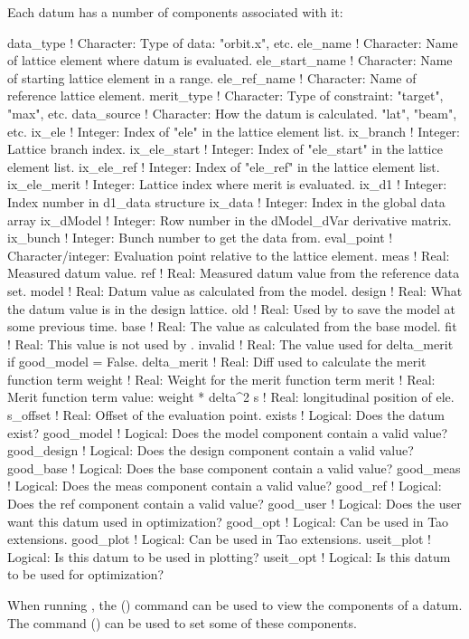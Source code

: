 Each datum has a number of components associated with it:
\begin{example}
  data_type        ! Character: Type of data: "orbit.x", etc.
  ele_name         ! Character: Name of lattice element where datum is evaluated.
  ele_start_name   ! Character: Name of starting lattice element in a range.
  ele_ref_name     ! Character: Name of reference lattice element.
  merit_type       ! Character: Type of constraint: "target", "max", etc.
  data_source      ! Character: How the datum is calculated. "lat", "beam", etc.
  ix_ele           ! Integer: Index of "ele" in the lattice element list.
  ix_branch        ! Integer: Lattice branch index.
  ix_ele_start     ! Integer: Index of "ele_start" in the lattice element list.
  ix_ele_ref       ! Integer: Index of "ele_ref" in the lattice element list.
  ix_ele_merit     ! Integer: Lattice index where merit is evaluated.
  ix_d1            ! Integer: Index number in d1_data structure
  ix_data          ! Integer: Index in the global data array
  ix_dModel        ! Integer: Row number in the dModel_dVar derivative matrix.
  ix_bunch         ! Integer: Bunch number to get the data from.
  eval_point       ! Character/integer: Evaluation point relative to the lattice element.
  meas             ! Real: Measured datum value. 
  ref              ! Real: Measured datum value from the reference data set.
  model            ! Real: Datum value as calculated from the model.
  design           ! Real: What the datum value is in the design lattice.
  old              ! Real: Used by \tao to save the model at some previous time.
  base             ! Real: The value as calculated from the base model.
  fit              ! Real: This value is not used by \tao.
  invalid          ! Real: The value used for delta_merit if good_model = False.
  delta_merit      ! Real: Diff used to calculate the merit function term 
  weight           ! Real: Weight for the merit function term
  merit            ! Real: Merit function term value: weight * delta^2
  s                ! Real: longitudinal position of ele.
  s_offset         ! Real: Offset of the evaluation point.
  exists           ! Logical: Does the datum exist?
  good_model       ! Logical: Does the model  component contain a valid value?
  good_design      ! Logical: Does the design component contain a valid value?
  good_base        ! Logical: Does the base   component contain a valid value?
  good_meas        ! Logical: Does the meas   component contain a valid value?
  good_ref         ! Logical: Does the ref    component contain a valid value?
  good_user        ! Logical: Does the user want this datum used in optimization?
  good_opt         ! Logical: Can be used in Tao extensions.
  good_plot        ! Logical: Can be used in Tao extensions.
  useit_plot       ! Logical: Is this datum to be used in plotting?
  useit_opt        ! Logical: Is this datum to be used for optimization?
\end{example}
When running \tao, the 
() command can be used to view the components of a datum. 
The  command () can be used to set some of these components.


